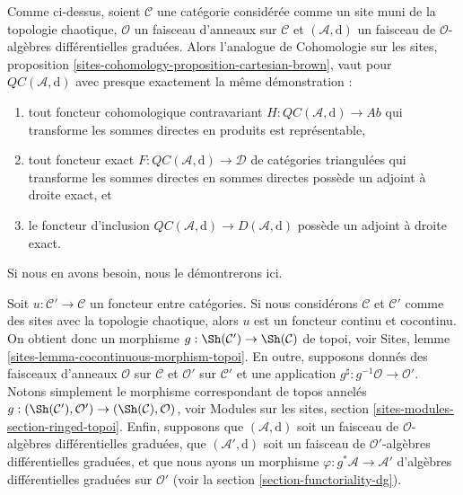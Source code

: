 \begin{remark}
\label{remark-cartesian-brown}
Comme ci-dessus, soient $\mathcal{C}$ une catégorie considérée comme un site muni de la topologie chaotique, $\mathcal{O}$ un faisceau d'anneaux sur $\mathcal{C}$ et $(\mathcal{A}, \text{d})$ un faisceau de $\mathcal{O}$-algèbres différentielles graduées.
Alors l'analogue de Cohomologie sur les sites, proposition \ref{sites-cohomology-proposition-cartesian-brown}, vaut pour $\mathit{QC}(\mathcal{A}, \text{d})$ avec presque exactement la même démonstration :
\begin{enumerate}
\item tout foncteur cohomologique contravariant $H : \mathit{QC}(\mathcal{A}, \text{d}) \to \textit{Ab}$ qui transforme les sommes directes en produits est représentable, \item tout foncteur exact $F : \mathit{QC}(\mathcal{A}, \text{d}) \to \mathcal{D}$ de catégories triangulées qui transforme les sommes directes en sommes directes possède un adjoint à droite exact, et \item le foncteur d'inclusion $\mathit{QC}(\mathcal{A}, \text{d}) \to D(\mathcal{A}, \text{d})$ possède un adjoint à droite exact.
\end{enumerate}
Si nous en avons besoin, nous le démontrerons ici.
\end{remark}

\noindent
Soit $u : \mathcal{C}' \to \mathcal{C}$ un foncteur entre catégories.
Si nous considérons $\mathcal{C}$ et $\mathcal{C}'$ comme des sites avec la topologie chaotique, alors $u$ est un foncteur continu et cocontinu.
On obtient donc un morphisme $g : \Sh(\mathcal{C}') \to \Sh(\mathcal{C})$ de topoi, voir Sites, lemme \ref{sites-lemma-cocontinuous-morphism-topoi}.
En outre, supposons donnés des faisceaux d'anneaux $\mathcal{O}$ sur $\mathcal{C}$ et $\mathcal{O}'$ sur $\mathcal{C}'$ et une application $g^\sharp : g^{-1}\mathcal{O} \to \mathcal{O}'$.
Notons simplement le morphisme correspondant de topos annelés $g : (\Sh(\mathcal{C}'), \mathcal{O}') \to (\Sh(\mathcal{C}), \mathcal{O})$, voir Modules sur les sites, section \ref{sites-modules-section-ringed-topoi}.
Enfin, supposons que $(\mathcal{A}, \text{d})$ soit un faisceau de $\mathcal{O}$-algèbres différentielles graduées, que $(\mathcal{A}', \text{d})$ soit un faisceau de $\mathcal{O}'$-algèbres différentielles graduées, et que nous ayons un morphisme $\varphi : g^*\mathcal{A} \to \mathcal{A}'$ d'algèbres différentielles graduées sur
$\mathcal{O}'$ (voir la section \ref{section-functoriality-dg}).


